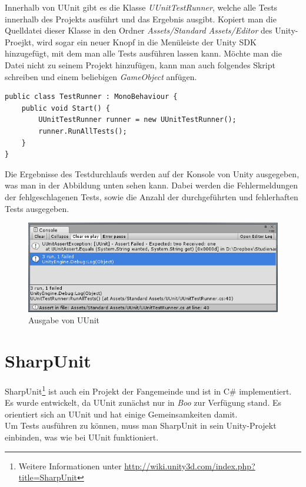 Innerhalb von UUnit gibt es die Klasse \textit{UUnitTestRunner}, welche alle Tests innerhalb des Projekts ausführt und das Ergebnis ausgibt. Kopiert man die Quelldatei dieser Klasse in den Ordner \textit{Assets/Standard Assets/Editor} des Unity-Proejkt, wird sogar ein neuer Knopf in die Menüleiste der Unity SDK hinzugefügt, mit dem man alle Tests ausführen lassen kann. Möchte man die Datei nicht zu seinem Projekt hinzufügen, kann man auch folgendes Skript schreiben und einem beliebigen \textit{GameObject} anfügen.

\begin{lstlisting}[caption={[Beispiel um alle UUnit-Tests auszuführen]Beispiel um alle UUnit-Tests auszuführen\\
Muss an ein \textit{GameObject} angehängt werden, wodurch beim Start des Spiels alle Tests ausgeführt werden.}, label=code:UUnitTestRunner]
public class TestRunner : MonoBehaviour {
	public void Start() {
		UUnitTestRunner runner = new UUnitTestRunner();
		runner.RunAllTests();
	}
}
\end{lstlisting}

Die Ergebnisse des Testdurchlaufs werden auf der Konsole von Unity ausgegeben, was man in der Abbildung unten sehen kann. Dabei werden die Fehlermeldungen der fehlgeschlagenen Tests, sowie die Anzahl der durchgeführten und fehlerhaften Tests ausgegeben.

\begin{figure}[h]
\centering
\includegraphics[width=1\linewidth]{./images/Kapitel_UnitTestsMitUnity/UUnit_Konsolenausgabe}
\caption[Ausgabe von UUnit]{Ausgabe von UUnit}
\label{fig:UUnit_Konsolenausgabe}
\end{figure}
\clearpage

\section{SharpUnit}\label{sec:SharpUnit}

SharpUnit\footnote{Weitere Informationen unter \url{http://wiki.unity3d.com/index.php?title=SharpUnit}} ist auch ein Projekt der Fangemeinde und ist in C\# implementiert. Es wurde entwickelt, da UUnit zunächst nur in \textit{Boo} zur Verfügung stand. Es orientiert sich an UUnit und hat einige Gemeinsamkeiten damit.\\
Um Tests ausführen zu können, muss man SharpUnit in sein Unity-Projekt einbinden, was wie bei UUnit funktioniert.

